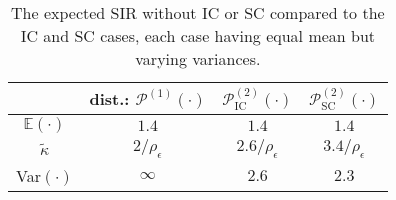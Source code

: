 \documentclass[lettersize,journal]{IEEEtran}
\begin{document}


\begin{table}[h]
  \begin{center}
    \caption{The expected SIR without IC or SC compared to the IC and SC cases, each case having equal mean but varying variances.}
    \label{table:tab1}
    \begin{tabular}{| c | c | c |c|}
      \hline
      & dist.: $\mathcal{P}^{(1)}(\cdot)$& $\mathcal{P}^{(2)}_{\text{IC}}(\cdot)$& $\mathcal{P}^{(2)}_{\text{SC}}(\cdot)$\\
      \hline
      $\mathbb{E}(\cdot)$&$1.4$ & $1.4$ &$1.4$\\ 
      \hline
      $\tilde{\kappa}$& $2/\rho_{\epsilon} $ &$2.6/\rho_{\epsilon}$& $3.4/\rho_{\epsilon}$\\
      \hline
      Var$(\cdot)$& $\infty$ & $2.6$ &$2.3$\\
      \hline 
    \end{tabular}
  \end{center}
\end{table}
\end{document}
